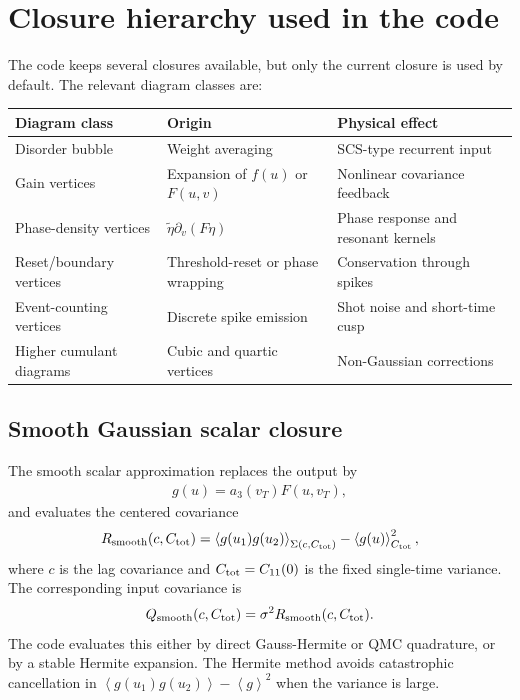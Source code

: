 \documentclass[pre,preprint,preprintnumbers,aps,eqsecnum,superscriptaddress,notitlepage,showpacs,floatfix]{revtex4-1}
\newcommand{\avg}[1]{\left\langle #1 \right\rangle}
\begin{document}
\section{Closure hierarchy used in the code}
\label{sec:closure_hierarchy}

The code keeps several closures available, but only the current closure is
used by default.  The relevant diagram classes are:
\begin{center}
\renewcommand{\arraystretch}{1.35}
\begin{tabular}{lll}
\hline
Diagram class & Origin & Physical effect \\
\hline
Disorder bubble & Weight averaging & SCS-type recurrent input \\
Gain vertices & Expansion of $f(u)$ or $F(u,v)$ & Nonlinear covariance feedback \\
Phase-density vertices & $\tilde\eta\partial_v(F\eta)$ & Phase response and resonant kernels \\
Reset/boundary vertices & Threshold-reset or phase wrapping & Conservation through spikes \\
Event-counting vertices & Discrete spike emission & Shot noise and short-time cusp \\
Higher cumulant diagrams & Cubic and quartic vertices & Non-Gaussian corrections \\
\hline
\end{tabular}
\end{center}

\subsection{Smooth Gaussian scalar closure}

The smooth scalar approximation replaces the output by
\begin{align}
g(u)=a_3(v_T)F(u,v_T),
\end{align}
and evaluates the centered covariance
\begin{align}
R_{\rm smooth}(c,C_{\rm tot})
=
\avg{g(u_1)g(u_2)}_{\Sigma(c,C_{\rm tot})}
-
\avg{g(u)}_{C_{\rm tot}}^2,
\label{eq:R_smooth}
\end{align}
where $c$ is the lag covariance and $C_{\rm tot}=C_{11}(0)$ is the fixed
single-time variance.  The corresponding input covariance is
\begin{align}
Q_{\rm smooth}(c,C_{\rm tot})=\sigma^2 R_{\rm smooth}(c,C_{\rm tot}).
\end{align}
The code evaluates this either by direct Gauss-Hermite or QMC quadrature, or
by a stable Hermite expansion.  The Hermite method avoids catastrophic
cancellation in
$\avg{g(u_1)g(u_2)}-\avg{g}^2$ when the variance is large.
\end{document}
